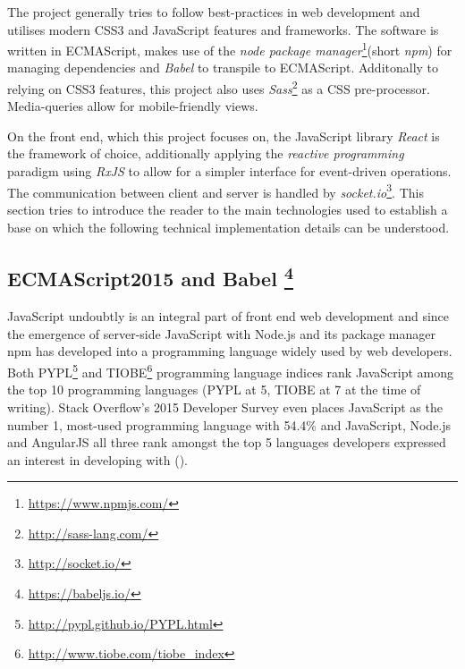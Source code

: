 The project generally tries to follow best-practices in web development and utilises modern CSS3 and JavaScript features and frameworks. The software is written in ECMA\-Script, makes use of the \emph{node package manager}\footnote{\url{https://www.npmjs.com/}}(short \emph{npm}) for managing dependencies and \emph{Babel} to transpile to ECMA\-Script. Additonally to relying on CSS3 features, this project also uses \emph{Sass}\footnote{\url{http://sass-lang.com/}} as a CSS pre-processor. Media-queries allow for mobile-friendly views.

On the front end, which this project focuses on, the JavaScript library \emph{React} is the framework of choice, additionally applying the \emph{reactive programming} paradigm using \emph{RxJS} to allow for a simpler interface for event-driven operations. The communication between client and server is handled by \emph{socket.io}\footnote{\url{http://socket.io/}}.
This section tries to introduce the reader to the main technologies used to establish a base on which the following technical implementation details can be understood.

\subsection[ECMAScript2015 and Babel]%
             {ECMAScript2015 and Babel%
             \protect\footnote{\url{https://babeljs.io/}}}%
\label{sec:implementation-architecture-es6}
JavaScript undoubtly is an integral part of front end web development and since the emergence of server-side JavaScript with Node.js and its package manager npm has developed into a programming language widely used by web developers. Both PYPL\footnote{\url{http://pypl.github.io/PYPL.html}} and TIOBE\footnote{\url{http://www.tiobe.com/tiobe_index}} programming language indices rank JavaScript among the top 10 programming languages (PYPL at 5, TIOBE at 7 at the time of writing). Stack Overflow's 2015 Developer Survey even places JavaScript as the number 1, most-used programming language with 54.4\% and JavaScript, Node.js and AngularJS all three rank amongst the top 5 languages developers expressed an interest in developing with (\cite{stackoverflow-developer-survey}).

